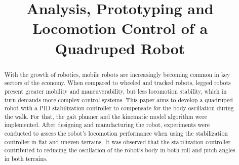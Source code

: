 \documentclass[conference]{IEEEtran}
\begin{document}
\title{Analysis, Prototyping and Locomotion Control of a Quadruped Robot\\
}


\maketitle

\begin{abstract}
  With the growth of robotics, mobile robots are increasingly becoming common in key sectors of the economy. When compared to wheeled and tracked robots, legged robots present greater mobility and maneuverability, but less locomotion stability, which in turn demands more complex control systems. This paper aims to develop a quadruped robot with a PID  stabilization controller to compensate for the body oscillation during the walk. For that, the gait planner and the kinematic model algorithm were implemented. After designing and manufacturing the robot, experiments were conducted to assess the robot's locomotion performance when using the stabilization controller in flat and uneven terrains. It was observed that the stabilization controller contributed to reducing the oscillation of the robot's body in both roll and pitch angles in both terrains.
\end{abstract}
\end{document}

